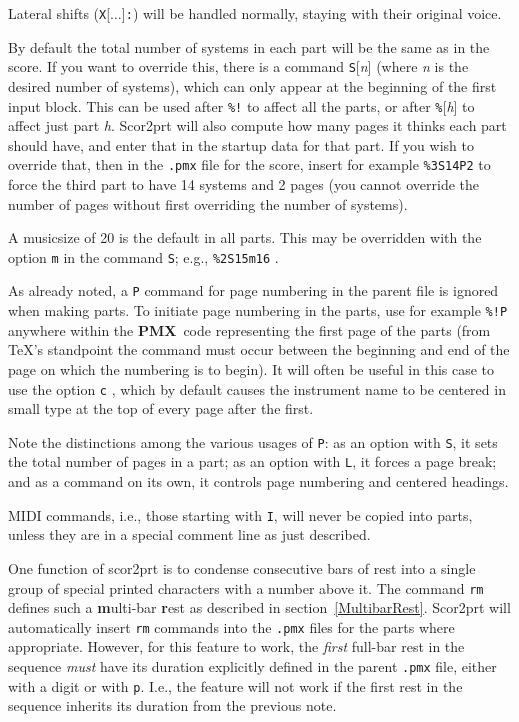 \documentclass[11pt]{article}
\newcommand\PMXX{\textbf{PMX}}
\newcommand\PMX{\PMXX~}
\def\newfrom{2.59}  %
\def\NEW#1{\ifdim#1 pt<\newfrom pt\else%
\marginpar{\fbox{#1}}\fi}
\begin{document}
Lateral shifts ({\tt X}[$\dots$]{\tt :}) will be handled normally,
staying with their original voice.

	By default the total number of systems in each part will be the 
same as in the score.  If you want to override this, there is a command 
{\tt S}[{\it n}] (where {\it n} is the desired number of systems), which 
can only appear at 
the beginning of the first input block.  This can be used after {\tt \%!} 
to affect all the parts, or after {\tt \%}[{\it h}] to affect just part {\it h}. 
 {\bfx Scor2prt} will also 
compute how many pages it thinks each part should have, and enter that 
in the startup data for that part.  If you wish to override that, then 
in the {\tt .pmx} file for the score, insert for example {\tt \%3S14P2} to 
force the third part to have 14 systems and 2 pages (you cannot override the 
number of pages without first overriding the number of systems).  

        A \NEW{2.0} musicsize of 20 is the default in all parts.  This may be 
overridden with the option {\tt m} in the command {\tt S}; e.g., 
{\tt \%2S15m16} .

	As already noted, a {\tt P} command for page numbering in the parent 
file is ignored when making parts.  To initiate page numbering in the 
parts, use for example {\tt \%!P} anywhere within the \PMX code representing 
the first page of the parts (from \TeX 's standpoint the command must occur 
between the beginning and end of the page on which the numbering is to begin). 
It \NEW{2.0} will often be useful in this case to use the option {\tt c} , 
which by default causes the instrument name to be centered in small type at 
the top of every page after the first.  

Note the distinctions among the various usages of {\tt P}: as an option with 
{\tt S}, it sets the total number of pages in a part; as an option with 
{\tt L}, it forces a page break; and as a command on its own, it controls page 
numbering and centered headings.

MIDI \NEW{2.2} commands, i.e., those starting with {\tt I}, will never be 
copied into parts, unless they are in a special comment line as just described.

	One function of {\bfx scor2prt} is to condense consecutive bars of rest 
into a single group of special printed characters with a number above it.    
The command {\tt rm} defines such a {\bf m}ulti-bar {\bf r}est as described 
in section~\ref{MultibarRest}. 
{\bfx Scor2prt} will automatically insert {\tt rm} commands into the 
{\tt .pmx} files 
for the parts where appropriate.  However, for this feature to work, 
the {\it first} full-bar rest in the sequence {\it must} have its duration 
explicitly defined in the parent {\tt .pmx} file, either with a digit or 
with {\tt p}.  I.e., the feature will not work if the first rest in the 
sequence inherits its duration from the previous note.
\end{document}
